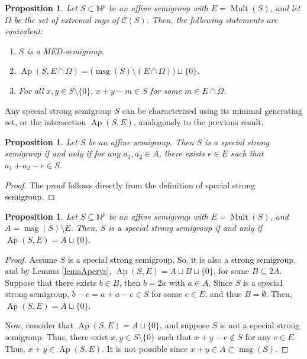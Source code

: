 \documentclass[a4paper,11pt]{article}
\newtheorem{proposition}[theorem]{Proposition}
\def\CaC{\mathcal{C}}
\def\N{\mathbb{N}}
\def\msg{\operatorname{msg}}
\def\Ap{\operatorname{Ap}}
\def\Mult{\operatorname{Mult}}
\begin{document}
{\begin{proposition}\label{prop:MED-NS}
Let $S\subset \N^p$ be an affine semigroup with $E=\Mult (S)$, and let $\Omega$ be the set of extremal rays of $\CaC(S)$. Then, the following statements are equivalent:
\begin{enumerate}
    \item $S$ is a MED-semigroup.
    \item $\Ap(S,E\cap \Omega)= \big(\msg(S)\setminus (E\cap \Omega)\big)\sqcup \{0\}$.
    \item For all $x,y\in S\setminus\{0\},\, x+y-m\in S$ for some $m\in E\cap \Omega$.
\end{enumerate}
\end{proposition}

Any special strong semigroup $S$ can be characterized using its minimal generating set, or the intersection $\Ap (S,E)$, analogously to the previous result.

\begin{proposition}\label{caracterizacion_EMED}
Let $S$ be an affine semigroup. Then $S$ is a special strong semigroup if and only if for any $a_1,a_2\in A$, there exists $e\in E$ such that $a_1+a_2-e\in S$.
\end{proposition}

\begin{proof}
The proof follows directly from the definition of special strong semigroup.
\end{proof}

\begin{proposition}
Let $S\subseteq \N^p$ be an affine semigroup with $E=\Mult (S)$, and $A=\msg(S)\setminus E$. Then, $S$ is a special strong semigroup if and only if $\Ap (S,E)= A \sqcup \{0\}$.
\end{proposition}

\begin{proof}
Assume $S$ is a special strong semigroup. So, it is also a strong semigroup, and by Lemma \ref{lemaAperys}, $\Ap (S,E)= A \sqcup B\sqcup \{0\}$, for some $B\subseteq 2A$. Suppose that there exists $b\in B$, then $b=2a$ with $a\in A$. Since $S$ is a special strong semigroup, $b-e=a+a-e\in S$ for some $e\in E$, and thus $B=\emptyset$. Then, $\Ap (S,E)= A \sqcup \{0\}$.

Now, consider that $\Ap (S,E)= A \sqcup \{0\}$, and suppose $S$ is not a special strong semigroup. Thus, there exist $x,y\in S\setminus\{0\}$ such that $x+y-e\notin S$ for any $e\in E$. Thus, $x+y\in \Ap (S,E)$. It is not possible since $x+y\in A\subset \msg(S)$.
\end{proof}

}
\end{document}
